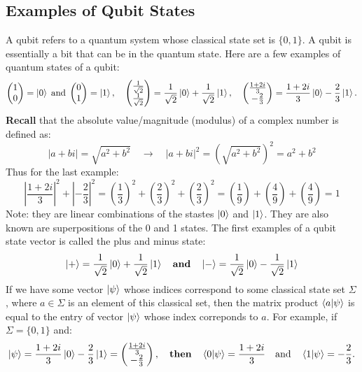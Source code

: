 \documentclass[11pt]{scrartcl}
\begin{document}
\subsection{Examples of Qubit States}
A qubit refers to a quantum system whose classical state set is $\{0, 1\}$. A qubit is essentially a bit that can be in the quantum state.
Here are a few examples of quantum states of a qubit:
\[
\begin{pmatrix}
1 \\
0
\end{pmatrix}
= \ket{0} \; \text{and} \;
\begin{pmatrix}
0 \\
1
\end{pmatrix}
= \ket{1}, \quad
\begin{pmatrix}
\frac{1}{\sqrt{2}} \\
\frac{1}{\sqrt{2}}
\end{pmatrix}
= \frac{1}{\sqrt{2}} \ket{0} + \frac{1}{\sqrt{2}} \ket{1},\quad
\begin{pmatrix}
	\frac{1 + 2i}{3} \\
	-\frac{2}{3}
	\end{pmatrix}
	= \frac{1 + 2i}{3} \ket{0} - \frac{2}{3} \ket{1}.
	\]
\textbf{Recall} that the absolute value/magnitude (modulus) of a complex number is defined as:
$$|a + bi| = \sqrt{a^2 + b^2} \quad \rightarrow \quad |a + bi|^2 = \left(\sqrt{a^2 + b^2}\right)^2 = a^2 + b^2$$
Thus for the last example:
$$ {\left|\frac{1 + 2i}{3}\right|}^2 + {\left|-\frac{2}{3}\right|}^2 = \left(\frac{1}{3}\right)^2 + \left(\frac{2}{3}\right)^2 + \left(\frac{2}{3}\right)^2 = \left(\frac{1}{9}\right) + \left(\frac{4}{9}\right) + \left(\frac{4}{9}\right) = 1$$
Note: they are linear combinations of the stastes $\ket{0}$ and $\ket{1}$. They are also known are superpositions of the 0 and 1 states.\vspace{2mm}
\newline
The first examples of a qubit state vector is called the plus and minus state:
$$\ket{+} = \frac{1}{\sqrt{2}}\ket{0} + \frac{1}{\sqrt{2}}\ket{1}\quad \textbf{and} \quad\ket{-} = \frac{1}{\sqrt{2}}\ket{0} - \frac{1}{\sqrt{2}}\ket{1}$$
If we have some vector $\ket{\psi}$ whose indices correspond to some classical state set $\Sigma$, where $a\in\Sigma$ is an 
element of this classical set, then the matrix product $\braket{a|\psi}$ is equal to the entry of vector $\ket{\psi}$
whose index correponds to $a$.\vspace{2mm}
For example, if $\Sigma = \{0, 1\}$ and:
\[
\ket{\psi} = \frac{1 + 2i}{3} \ket{0} - \frac{2}{3} \ket{1} = \begin{pmatrix} \frac{1 + 2i}{3} \\ -\frac{2}{3} \end{pmatrix},
\quad \textbf{then} \quad
\braket{0 | \psi} = \frac{1 + 2i}{3} \quad \text{and} \quad \braket{1 | \psi} = -\frac{2}{3}.
\]
\end{document}
